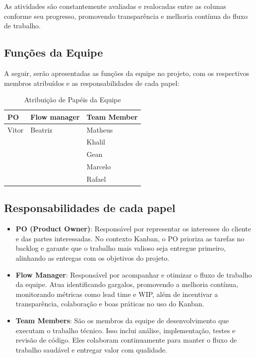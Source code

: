 \documentclass[
	12pt,				%
	openany,			%
	twoside,			%
	a4paper,			%
	english,			%
	brazil				%
	]{abntex2}
\begin{document}
As atividades são constantemente avaliadas e realocadas entre as colunas conforme seu progresso, promovendo transparência e melhoria contínua do fluxo de trabalho.

\subsection{Funções da Equipe}

A seguir, serão apresentadas as funções da equipe no projeto, com os respectivos membros atribuídos e as responsabilidades de cada papel:

\begin{table}[htbp]
\centering
\begin{tabular}{|l|l|l|}
\hline
\textbf{PO} & \textbf{Flow manager} & \textbf{Team Member} \\ \hline
Vitor        & Beatriz      & Matheus             \\ \hline
             &              & Khalil         \\ \hline
             &              & Gean                \\ \hline
             &              & Marcelo             \\ \hline
             &              & Rafael              \\ \hline
\end{tabular}
\caption{Atribuição de Papéis da Equipe}
\end{table}

\FloatBarrier

\subsection{Responsabilidades de cada papel}

\begin{itemize}
    \item \textbf{PO (Product Owner)}: 
    Responsável por representar os interesses do cliente e das partes interessadas. No contexto Kanban, o PO prioriza as tarefas no backlog e garante que o trabalho mais valioso seja entregue primeiro, alinhando as entregas com os objetivos do projeto.
    
    \item \textbf{Flow Manager}: 
    Responsável por acompanhar e otimizar o fluxo de trabalho da equipe. Atua identificando gargalos, promovendo a melhoria contínua, monitorando métricas como lead time e WIP, além de incentivar a transparência, colaboração e boas práticas no uso do Kanban.
    
    \item \textbf{Team Members}: 
    São os membros da equipe de desenvolvimento que executam o trabalho técnico. Isso inclui análise, implementação, testes e revisão de código. Eles colaboram continuamente para manter o fluxo de trabalho saudável e entregar valor com qualidade.
\end{itemize}
\end{document}
